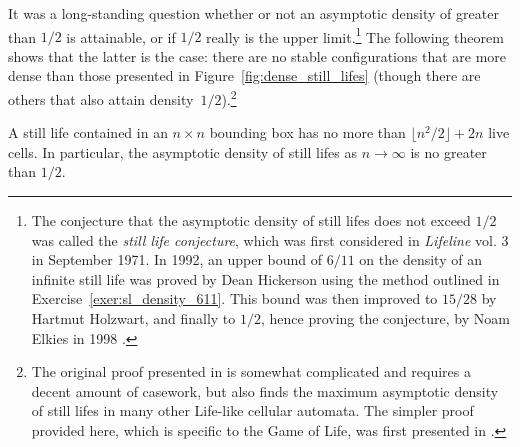 It was a long-standing question whether or not an asymptotic density of greater than $1/2$ is attainable, or if $1/2$ really is the upper limit.\footnote{The conjecture that the asymptotic density of still lifes does not exceed $1/2$ was called the \emph{still life conjecture}, which was first considered in \emph{Lifeline} vol. 3 in September 1971. In 1992, an upper bound of $6/11$ on the density of an infinite still life was proved by Dean Hickerson using the method outlined in Exercise~\ref{exer:sl_density_611}. This bound was then improved to $15/28$ by Hartmut Holzwart, and finally to $1/2$, hence proving the conjecture, by Noam Elkies in 1998 \cite{Elk98}.} The following theorem shows that the latter is the case: there are no stable configurations that are more dense than those presented in Figure~\ref{fig:dense_still_lifes} (though there are others that also attain density~$1/2$).\footnote{The original proof presented in \cite{Elk98} is somewhat complicated and requires a decent amount of casework, but also finds the maximum asymptotic density of still lifes in many other Life-like cellular automata. The simpler proof provided here, which is specific to the Game of Life, was first presented in \cite{CSB09}.}

\begin{theorem}\label{thm:still_life_density}
	A still life contained in an $n \times n$ bounding box has no more than $\lfloor n^2/2 \rfloor + 2n$ live cells. In particular, the asymptotic density of still lifes as $n \rightarrow \infty$ is no greater than $1/2$.
\end{theorem}

